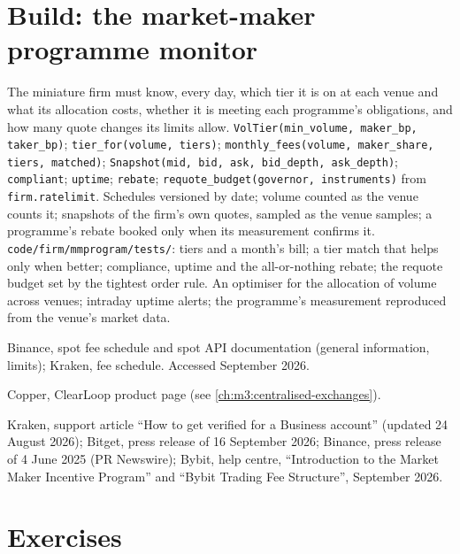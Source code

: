 \section{Build: the market-maker programme monitor}\label{bld:m3:getting-access-crypto-venues:mmprogram}

\begin{build}
 The miniature firm must know, every day, which tier it is on at each venue and what its allocation costs, whether it is meeting each
programme's obligations, and how many quote changes its limits allow.
 \texttt{VolTier(min\_volume, maker\_bp, taker\_bp)}; \texttt{tier\_for(volume, tiers)}; \texttt{monthly\_fees(volume, maker\_share,
tiers, matched)}; \texttt{Snapshot(mid, bid, ask, bid\_depth, ask\_depth)}; \texttt{compliant}; \texttt{uptime}; \texttt{rebate}; \texttt{requote\_budget(governor,
instruments)} from \texttt{firm.ratelimit}.
 Schedules versioned by date; volume counted as the venue counts it; snapshots of the firm's own quotes, sampled as the venue samples; a
programme's rebate booked only when its measurement confirms it.
 \texttt{code/firm/mmprogram/tests/}: tiers and a month's bill; a tier match that helps only when better; compliance, uptime and
the all-or-nothing rebate; the requote budget set by the tightest order rule.
 An optimiser for the allocation of volume across venues; intraday uptime alerts; the programme's measurement reproduced from the venue's
market data.
\end{build}

\begin{omsources}
\item Binance, spot fee schedule and spot API documentation (general information, limits); Kraken, fee schedule. Accessed September 2026.
\item Copper, ClearLoop product page (see \cref{ch:m3:centralised-exchanges}).
\item Kraken, support article ``How to get verified for a Business account'' (updated 24 August 2026); Bitget, press release of 16 September 2026;
Binance, press release of 4 June 2025 (PR Newswire); Bybit, help centre, ``Introduction to the Market Maker Incentive Program'' and
``Bybit Trading Fee Structure'', September 2026.
\end{omsources}

\section{Exercises}

